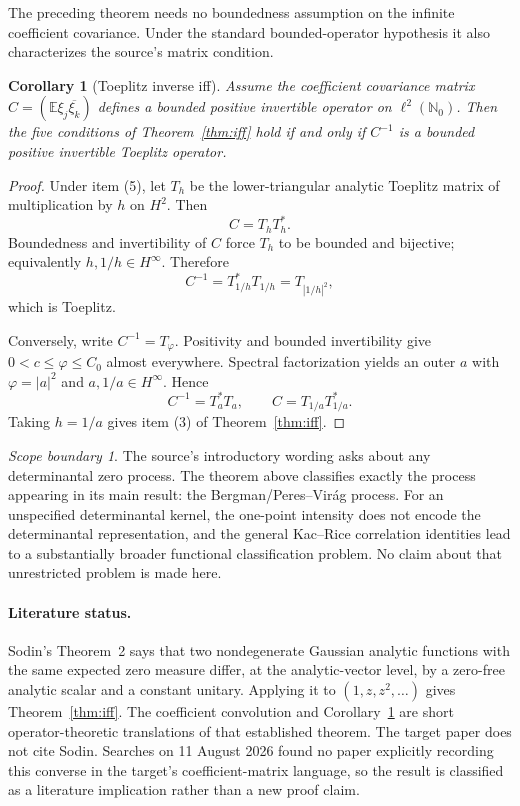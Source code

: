 \documentclass[11pt]{article}
\newtheorem{corollary}[theorem]{Corollary}
\theoremstyle{remark}
\newtheorem*{remark}{Scope boundary}
\newcommand{\E}{\mathbb E}
\begin{document}
The preceding theorem needs no boundedness assumption on the infinite
coefficient covariance.  Under the standard bounded-operator hypothesis it
also characterizes the source's matrix condition.

\begin{corollary}[Toeplitz inverse iff]\label{cor:toeplitz}
Assume the coefficient covariance matrix $C=(\E\xi_j\overline{\xi_k})$ defines
a bounded positive invertible operator on $\ell^2(\mathbb N_0)$.  Then the five
conditions of Theorem~\ref{thm:iff} hold if and only if $C^{-1}$ is a bounded
positive invertible Toeplitz operator.
\end{corollary}

\begin{proof}
Under item (5), let $T_h$ be the lower-triangular analytic Toeplitz matrix of
multiplication by $h$ on $H^2$.  Then
\[
 C=T_hT_h^*.
\]
Boundedness and invertibility of $C$ force $T_h$ to be bounded and bijective;
equivalently $h,1/h\in H^\infty$.  Therefore
\[
 C^{-1}=T_{1/h}^*T_{1/h}=T_{|1/h|^2},
\]
which is Toeplitz.

Conversely, write $C^{-1}=T_\varphi$.  Positivity and bounded invertibility
give $0<c\le\varphi\le C_0$ almost everywhere.  Spectral factorization yields
an outer $a$ with $\varphi=|a|^2$ and $a,1/a\in H^\infty$.  Hence
\[
 C^{-1}=T_a^*T_a,
 \qquad
 C=T_{1/a}T_{1/a}^*.
\]
Taking $h=1/a$ gives item (3) of Theorem~\ref{thm:iff}.
\end{proof}

\begin{remark}
The source's introductory wording asks about any determinantal zero process.
The theorem above classifies exactly the process appearing in its main result:
the Bergman/Peres--Vir\'ag process.  For an unspecified determinantal kernel,
the one-point intensity does not encode the determinantal representation, and
the general Kac--Rice correlation identities lead to a substantially broader
functional classification problem.  No claim about that unrestricted problem
is made here.
\end{remark}

\paragraph{Literature status.}
Sodin's Theorem~2 says that two nondegenerate Gaussian analytic functions with
the same expected zero measure differ, at the analytic-vector level, by a
zero-free analytic scalar and a constant unitary.  Applying it to
$(1,z,z^2,\ldots)$ gives Theorem~\ref{thm:iff}.  The coefficient convolution
and Corollary~\ref{cor:toeplitz} are short operator-theoretic translations of
that established theorem.  The target paper does not cite Sodin.  Searches on
11 August 2026 found no paper explicitly recording this converse in the
target's coefficient-matrix language, so the result is classified as a
literature implication rather than a new proof claim.
\end{document}
